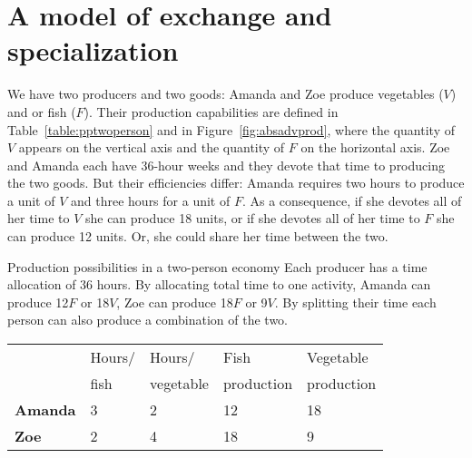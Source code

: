 \section{A model of exchange and specialization}\label{sec:ch1sec4}

We have two producers and two goods:  Amanda and Zoe produce vegetables ($V$) and or fish ($F$). Their production capabilities are defined in Table~\ref{table:pptwoperson} and in Figure~\ref{fig:absadvprod}, where the quantity of $V$ appears on the vertical axis and the quantity of $F$ on the horizontal axis. Zoe and Amanda each have 36-hour weeks and they devote that time to producing the two goods. But their efficiencies differ: Amanda requires two hours to produce a unit of $V$ and three hours for a unit of $F$. As a consequence, if she devotes all of her time to $V$ she can produce 18 units, or if she devotes all of her time to $F$ she can produce 12 units. Or, she could share her time between the two.

\begin{Table}{25em}{Production possibilities in a two-person economy \label{table:pptwoperson}}{Each producer has a time allocation of 36 hours. By allocating total time to one activity, Amanda can produce 12$F$ or 18$V$, Zoe can produce 18$F$ or 9$V$. By splitting their time each person can also produce a combination of the two.}
\begin{tabu} to 30em {|X[1,c]X[1,c]X[1,c]X[1,c]X[1,c]|}	\hline
{}				&	Hours/	&	Hours/		&	Fish		&	Vegetable	\\[-0.1em]
				&	fish	&	vegetable	&	production	&	production	\\
\textbf{Amanda}						&	3		&	2			&	12			&	18			\\
\textbf{Zoe}	&	2		&	4			&	18			&	9			\\	\hline
\end{tabu}
\end{Table}



